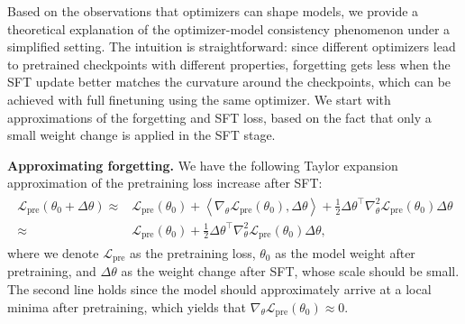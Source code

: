 \documentclass{article}
\theoremstyle{remark}
\newcommand{\dotprod}[2]{\left\langle#1,#2\right\rangle}
\newcommand{\Lp}{\mathcal{L}_{\mathrm{pre}}}
\begin{document}
Based on the observations that optimizers can shape models, we provide a theoretical explanation of the optimizer-model consistency phenomenon under a simplified setting. The intuition is straightforward: since different optimizers lead to pretrained checkpoints with different properties, forgetting gets less when the SFT update better matches the curvature around the checkpoints, which can be achieved with full finetuning using the same optimizer.
We start with approximations of the forgetting and SFT loss, based on the fact that only a small weight change is applied in the SFT stage.

\textbf{Approximating forgetting.}
We have the following Taylor expansion approximation of the pretraining loss increase after SFT:
\vspace{-0.2cm}
\begin{align*}
\begin{split}
    \Lp(\theta_0 + \Delta \theta) \approx& \Lp(\theta_0) + \dotprod{\nabla_\theta \Lp(\theta_0)}{\Delta \theta} + \frac{1}{2} \Delta \theta^\top \nabla_\theta^2 \Lp(\theta_0) \Delta \theta \\
    \approx& \Lp(\theta_0) + \frac{1}{2} \Delta \theta^\top \nabla_\theta^2 \Lp(\theta_0) \Delta \theta ,
\end{split}
\end{align*}
where we denote $\Lp$ as the pretraining loss, $\theta_0 $ as the model weight after pretraining, and $\Delta \theta$ as the weight change after SFT, whose scale should be small. The second line holds since the model should approximately arrive at a local minima after pretraining, which yields that $\nabla_\theta \Lp(\theta_0) \approx 0$.
\end{document}
